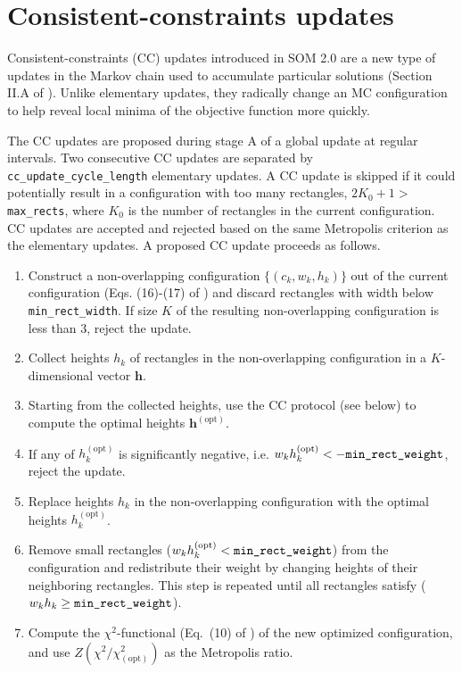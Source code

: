 \documentclass[]{article}
\begin{document}
\section{Consistent-constraints updates}
\label{cc_update}

Consistent-constraints (CC) updates introduced in SOM 2.0 are a new type of updates in the Markov chain used to accumulate particular solutions (Section II.A of \cite{socc_paper}). Unlike elementary updates, they radically change an MC configuration to help reveal local minima of the objective function more quickly.

The CC updates are proposed during stage A of a global update at regular intervals. Two consecutive CC updates are separated by \verb|cc_update_cycle_length| elementary updates. A CC update is skipped if it could potentially result in a configuration with too many rectangles, $2K_0+1>$ \verb|max_rects|, where $K_0$ is the number of rectangles in the current configuration.
CC updates are accepted and rejected based on the same Metropolis criterion as the elementary updates.
A proposed CC update proceeds as follows.
\begin{enumerate}
    \item Construct a non-overlapping configuration $\{(c_k, w_k, h_k)\}$ out of the current  configuration (Eqs. (16)-(17) of \cite{socc_paper}) and discard rectangles with width below \verb|min_rect_width|. If size $K$ of the resulting non-overlapping configuration is less than 3, reject the update.

    \item Collect heights $h_k$ of rectangles in the non-overlapping configuration in a $K$-dimensional vector $\mathbf{h}$.

    \item Starting from the collected heights, use the CC protocol (see below) to compute the optimal heights $\mathbf{h}^\mathrm{(opt)}$.

    \item If any of $h^\mathrm{(opt)}_k$ is significantly negative, i.e. $w_k h^\mathrm{(opt)}_k < -\verb|min_rect_weight|$, reject the update.

    \item Replace heights $h_k$ in the non-overlapping configuration with the optimal heights $h^\mathrm{(opt)}_k$.

    \item Remove small rectangles ($w_k h^\mathrm{(opt)}_k < \verb|min_rect_weight|$) from the configuration and redistribute their weight by changing heights of their neighboring rectangles. This step is repeated until all rectangles satisfy ($w_k h_k \geq \verb|min_rect_weight|$).

    \item Compute the $\chi^2$-functional (Eq.~(10) of \cite{socc_paper}) of the new optimized configuration, and use $Z(\chi^2 /\chi^2_\mathrm{(opt)})$ as the Metropolis ratio.
\end{enumerate}
\end{document}

